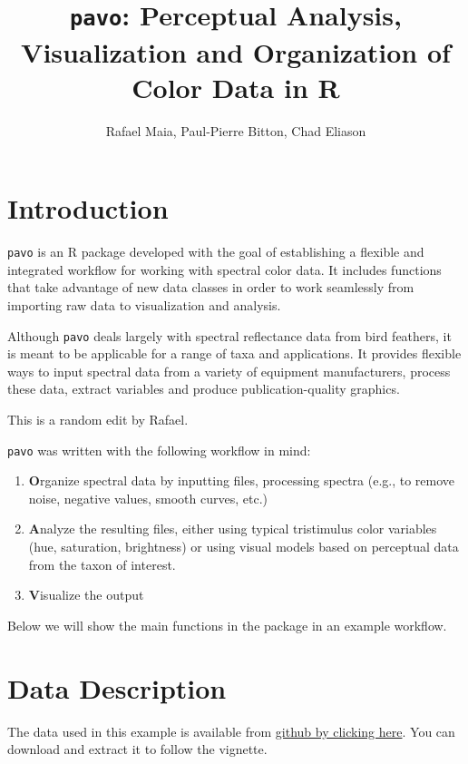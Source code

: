 \documentclass{article}
\newcommand{\pavo}{{\tt pavo}}  %
\begin{document}



\title{\pavo{}: {\bf P}erceptual {\bf A}nalysis, {\bf V}isualization and {\bf O}rganization of Color Data in R}
\author{Rafael Maia, Paul-Pierre Bitton, Chad Eliason}

\maketitle

\section*{Introduction}

\pavo{} is an R package developed with the goal of establishing a flexible and integrated 
workflow for working with spectral color data. It includes functions that take advantage of
new data classes in order to work seamlessly from importing raw data to visualization and 
analysis.

Although \pavo{} deals largely with spectral reflectance data from bird feathers, it is meant 
to be applicable for a range of taxa and applications. It provides flexible ways to input
spectral data from a variety of equipment manufacturers, process these data, extract variables 
and produce publication-quality graphics.

This is a random edit by Rafael.

\pavo{} was written with the following workflow in mind:

\begin{enumerate}
\item {\bf O}rganize spectral data by inputting files, processing spectra (e.g., to remove
noise, negative values, smooth curves, etc.)
\item {\bf A}nalyze the resulting files, either using typical tristimulus color variables (hue,
saturation, brightness) or using visual models based on perceptual data from the taxon of interest.
\item {\bf V}isualize the output
\end{enumerate}

Below we will show the main functions in the package in an example workflow. 

\section{Data Description}

The data used in this example is available from 
\href{https://github.com/rmaia/pavo/blob/master/vignette_data/vignette_data.zip}{github by clicking here}. 
You can download and extract it to follow the vignette.
\end{document}
